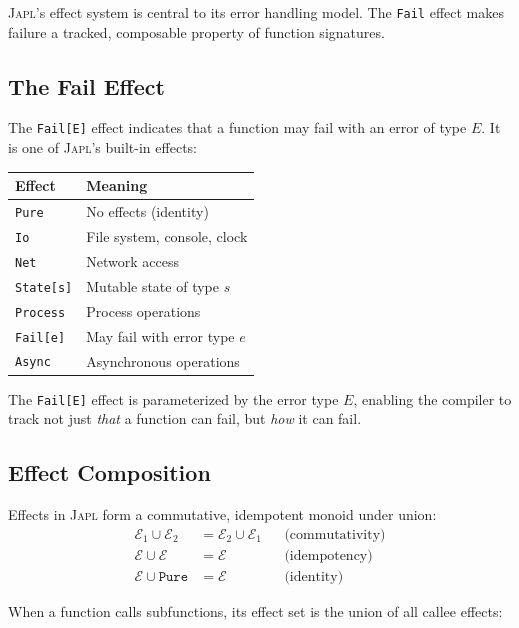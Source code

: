 \documentclass[11pt,twocolumn]{article}
\newcommand{\japl}{\textsc{Japl}}
\newcommand{\Fail}{\texttt{Fail}}
\newcommand{\Eff}{\mathcal{E}}
\begin{document}
\japl{}'s effect system is central to its error handling model. The \Fail{} effect makes failure a tracked, composable property of function signatures.

\subsection{The Fail Effect}

The \texttt{Fail[E]} effect indicates that a function may fail with an error of type $E$. It is one of \japl{}'s built-in effects:

\begin{center}
\begin{tabular}{@{}ll@{}}
\toprule
\textbf{Effect} & \textbf{Meaning} \\
\midrule
\texttt{Pure} & No effects (identity) \\
\texttt{Io} & File system, console, clock \\
\texttt{Net} & Network access \\
\texttt{State[s]} & Mutable state of type $s$ \\
\texttt{Process} & Process operations \\
\texttt{Fail[e]} & May fail with error type $e$ \\
\texttt{Async} & Asynchronous operations \\
\bottomrule
\end{tabular}
\end{center}

The \texttt{Fail[E]} effect is parameterized by the error type $E$, enabling the compiler to track not just \emph{that} a function can fail, but \emph{how} it can fail.

\subsection{Effect Composition}

Effects in \japl{} form a commutative, idempotent monoid under union:
\begin{align*}
  \Eff_1 \cup \Eff_2 &= \Eff_2 \cup \Eff_1 && \text{(commutativity)} \\
  \Eff \cup \Eff &= \Eff && \text{(idempotency)} \\
  \Eff \cup \mathtt{Pure} &= \Eff && \text{(identity)}
\end{align*}

When a function calls subfunctions, its effect set is the union of all callee effects:
\end{document}
